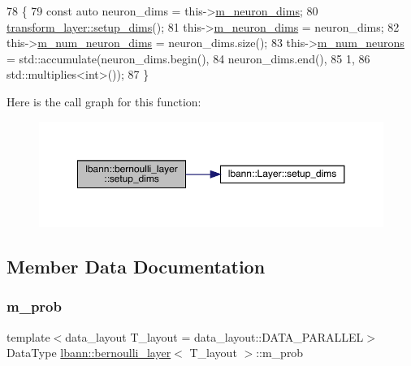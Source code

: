 \begin{DoxyCode}
78                              \{
79     \textcolor{keyword}{const} \textcolor{keyword}{auto} neuron\_dims = this->\hyperlink{classlbann_1_1Layer_abb34bb8031f57a483e2e327a5f229f48}{m\_neuron\_dims};
80     \hyperlink{classlbann_1_1Layer_a90fce1b06c1f2abb480e18cfe08a9746}{transform\_layer::setup\_dims}();
81     this->\hyperlink{classlbann_1_1Layer_abb34bb8031f57a483e2e327a5f229f48}{m\_neuron\_dims} = neuron\_dims;
82     this->\hyperlink{classlbann_1_1Layer_adfd6178d21498c9095cd947ae1eb2d6a}{m\_num\_neuron\_dims} = neuron\_dims.size();
83     this->\hyperlink{classlbann_1_1Layer_a6b5ebc8a7d9329d8a773ed787e7b41d8}{m\_num\_neurons} = std::accumulate(neuron\_dims.begin(),
84                                           neuron\_dims.end(),
85                                           1,
86                                           std::multiplies<int>());
87   \}
\end{DoxyCode}
Here is the call graph for this function\+:\nopagebreak
\begin{figure}[H]
\begin{center}
\leavevmode
\includegraphics[width=350pt]{classlbann_1_1bernoulli__layer_aabaf1d2ba92aa4c708d3a76d82bdbdb6_cgraph}
\end{center}
\end{figure}


\subsection{Member Data Documentation}
\mbox{\label{classlbann_1_1bernoulli__layer_a4f4b68b455233b5e4c5c6f992289669c}} 
\subsubsection{\texorpdfstring{m\+\_\+prob}{m\_prob}}
{\footnotesize\ttfamily template$<$data\+\_\+layout T\+\_\+layout = data\+\_\+layout\+::\+D\+A\+T\+A\+\_\+\+P\+A\+R\+A\+L\+L\+EL$>$ \\
Data\+Type \hyperlink{classlbann_1_1bernoulli__layer}{lbann\+::bernoulli\+\_\+layer}$<$ T\+\_\+layout $>$\+::m\+\_\+prob\hspace{0.3cm}{\ttfamily [private]}}

